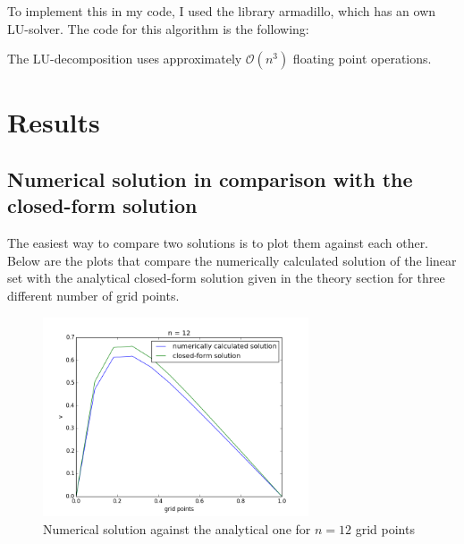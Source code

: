 \documentclass[a4paper,norsk,12pt,oneside]{article}
\begin{document}
To implement this in my code, I used the library armadillo, which has an own LU-solver.
The code for this algorithm is the following:



The LU-decomposition uses approximately \(\mathcal{O}(n^3)\) floating point operations. 

\section{Results}

\subsection{Numerical solution in comparison with the closed-form solution}\label{subsec:resplot}

The easiest way to compare two solutions is to plot them against each other. 
Below are the plots that compare the numerically calculated solution of the
linear set with the
analytical closed-form solution given in the theory section for three different number of grid points. 

\begin{figure}[H]
        \centering %
        \includegraphics[width=0.7\textwidth]{blabla_12.png}
        \caption{Numerical solution against the analytical one for \(n = 12\) grid points} 
    \end{figure}
\end{document}
